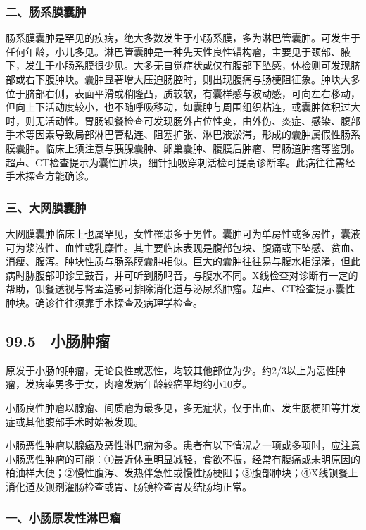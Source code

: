 \subsubsection{二、肠系膜囊肿}

肠系膜囊肿是罕见的疾病，绝大多数发生于小肠系膜，多为淋巴管囊肿。可发生于任何年龄，小儿多见。淋巴管囊肿是一种先天性良性错构瘤，主要见于颈部、腋下，发生于小肠系膜很少见。大多无自觉症状或仅有腹部下坠感，体检则可发现脐部或右下腹肿块。囊肿显著增大压迫肠腔时，则出现腹痛与肠梗阻征象。肿块大多位于脐部右侧，表面平滑或稍隆凸，质较软，有囊样感与波动感，可向左右移动，但向上下活动度较小，也不随呼吸移动，如囊肿与周围组织粘连，或囊肿体积过大时，则无活动性。胃肠钡餐检查可发现肠外占位性变，由外伤、炎症、感染、腹部手术等因素导致局部淋巴管粘连、阻塞扩张、淋巴液淤滞，形成的囊肿属假性肠系膜囊肿。临床上须注意与胰腺囊肿、卵巢囊肿、腹膜后肿瘤、胃肠道肿瘤等鉴别。超声、CT检查提示为囊性肿块，细针抽吸穿刺活检可提高诊断率。此病往往需经手术探查方能确诊。

\subsubsection{三、大网膜囊肿}

大网膜囊肿临床上也属罕见，女性罹患多于男性。囊肿可为单房性或多房性，囊液可为浆液性、血性或乳糜性。其主要临床表现是腹部包块、腹痛或下坠感、贫血、消瘦、腹泻。肿块性质与肠系膜囊肿相似。巨大的囊肿往往易与腹水相混淆，但此病时胁腹部叩诊呈鼓音，并可听到肠鸣音，与腹水不同。X线检查对诊断有一定的帮助，钡餐透视与肾盂造影可排除消化道与泌尿系肿瘤。超声、CT检查提示囊性肿块。确诊往往须靠手术探查及病理学检查。

\subsection{99.5　小肠肿瘤}

原发于小肠的肿瘤，无论良性或恶性，均较其他部位为少。约2/3以上为恶性肿瘤，发病率男多于女，肉瘤发病年龄较癌平均约小10岁。

小肠良性肿瘤以腺瘤、间质瘤为最多见，多无症状，仅于出血、发生肠梗阻等并发症或其他腹部手术时始被发现。

小肠恶性肿瘤以腺癌及恶性淋巴瘤为多。患者有以下情况之一项或多项时，应注意小肠恶性肿瘤的可能：①最近体重明显减轻，食欲不振，经常有腹痛或未明原因的柏油样大便；②慢性腹泻、发热伴急性或慢性肠梗阻；③腹部肿块；④X线钡餐上消化道及钡剂灌肠检查或胃、肠镜检查胃及结肠均正常。

\subsubsection{一、小肠原发性淋巴瘤}

